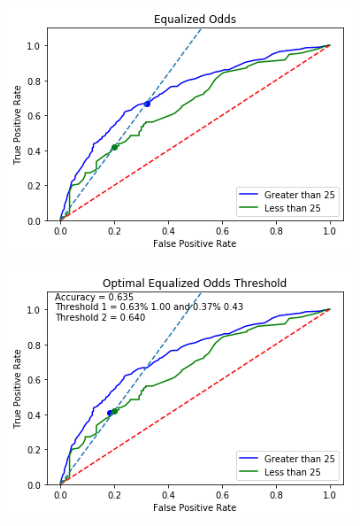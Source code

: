 \documentclass[11pt, fleqn, titlepage]{article}
\begin{document}
	\begin{figure}[H]
		\centering
		\begin{subfigure}{0.5\textwidth}
			\centering
			\includegraphics[width=0.9\linewidth]{"imgs/Equalized Odds Optimal_age"}
		\end{subfigure}%
		\begin{subfigure}{0.5\textwidth}
			\centering
			\includegraphics[width=0.9\linewidth]{"imgs/Equalized Odds Correctied_age"}
		\end{subfigure}

\end{figure}
\end{document}
